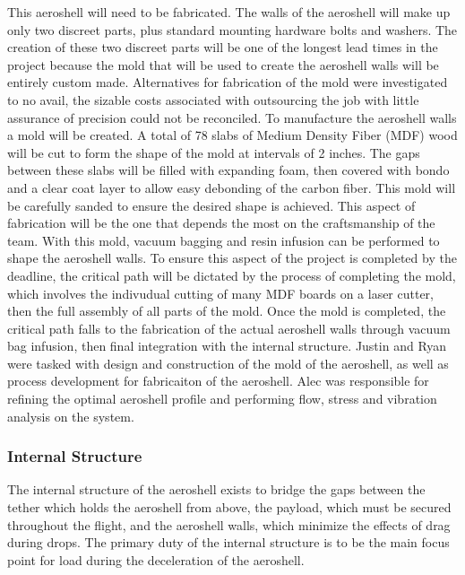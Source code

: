 \indent This aeroshell will need to be fabricated. The walls of the aeroshell will make up only two discreet parts, plus standard mounting hardware bolts and washers. The creation of these two discreet parts will be one of the longest lead times in the project because the mold that will be used to create the aeroshell walls will be entirely custom made. Alternatives for fabrication of the mold were investigated to no avail, the sizable costs associated with outsourcing the job with little assurance of precision could not be reconciled. To manufacture the aeroshell walls a mold will be created. A total of 78 slabs of Medium Density Fiber (MDF) wood will be cut to form the shape of the mold at intervals of 2 inches. The gaps between these slabs will be filled with expanding foam, then covered with bondo and a clear coat layer to allow easy debonding of the carbon fiber. This mold will be carefully sanded to ensure the desired shape is achieved. This aspect of fabrication will be the one that depends the most on the craftsmanship of the team. With this mold, vacuum bagging and resin infusion can be performed to shape the aeroshell walls. To ensure this aspect of the project is completed by the deadline, the critical path will be dictated by the process of completing the mold, which involves the indivudual cutting of many MDF boards on a laser cutter, then the full assembly of all parts of the mold. Once the mold is completed, the critical path falls to the fabrication of the actual aeroshell walls through vacuum bag infusion, then final integration with the internal structure. Justin and Ryan were tasked with design and construction of the mold of the aeroshell, as well as process development for fabricaiton of the aeroshell. Alec was responsible for refining the optimal aeroshell profile and performing flow, stress and vibration analysis on the system.



\subsubsection{Internal Structure}

\indent\indent The internal structure of the aeroshell exists to bridge the gaps between the tether which holds the aeroshell from above, the payload, which must be secured throughout the flight, and the aeroshell walls, which minimize the effects of drag during drops. The primary duty of the internal structure is to be the main focus point for load during the deceleration of the aeroshell. 

